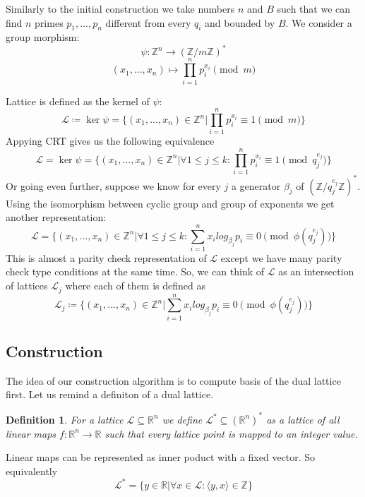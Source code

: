 \documentclass[12pt]{article}
\newcommand{\ZZ}{\mathbb{Z}}
\newcommand{\LL}{\mathcal{L}}
\newtheorem{definition}{Definition}
\begin{document}
Similarly to the initial construction we take numbers $n$ and $B$ such that we can find $n$ primes $p_{1}, ... , p_{n}$ different from every $q_{i}$ and bounded by $B$. We consider a group morphism:
\begin{equation}
    \psi : \ZZ^{n} \rightarrow (\ZZ/m\ZZ)^*
\end{equation}
\begin{equation}
    (x_{1}, ..., x_{n}) \mapsto \prod_{i=1}^{n}p_{i}^{x_{i}} \pmod{m}
\end{equation}

Lattice is defined as the kernel of $\psi$:
\begin{equation}
    \LL \coloneqq \ker \psi = \{(x_{1}, ..., x_{n}) \in \ZZ^{n} | \prod_{i=1}^{n}p_{i}^{x_{i}} \equiv 1 \pmod{m}\}
\end{equation}
Appying CRT gives us the following equivalence
\begin{equation}
    \LL = \ker \psi = \{(x_{1}, ..., x_{n}) \in \ZZ^{n} |  \forall 1 \leq j \leq k: \prod_{i=1}^{n}p_{i}^{x_{i}} \equiv 1 \pmod{q_{j}^{e_{j}}}\}
\end{equation}
Or going even further, suppose we know for every $j$ a generator ${\beta_{j}}$ of  $(\ZZ/q_{j}^{e_{j}}\ZZ)^*$. Using the isomorphism between cyclic group and group of exponents we get another representation:
\begin{equation}
    \LL = \{(x_{1}, ..., x_{n}) \in \ZZ^{n} |  \forall 1 \leq j \leq k: \sum_{i=1}^{n}x_{i}log_{\beta_{j}}p_{i}\equiv 0 \pmod{\phi(q_{j}^{e_{j}})}\}
\end{equation}
This is almost a parity check representation of $\LL$ except we have many parity check type conditions at the same time. So, we can think of $\LL$ as an intersection of lattices $\LL_{j}$ where each of them is defined as
\begin{equation}
    \LL_{j} \coloneqq \{(x_{1}, ..., x_{n}) \in \ZZ^{n} | \sum_{i=1}^{n}x_{i}log_{\beta_{j}}p_{i}\equiv 0 \pmod{\phi(q_{j}^{e_{j}})}\}
\end{equation}

\subsection{Construction}
The idea of our construction algorithm is to compute basis of the dual lattice first. %
Let us remind a definiton of a dual lattice.
\begin{definition}
    For a lattice $\LL \subseteq \mathbb{R}^{n}$ we define $\LL^{*} \subseteq (\mathbb{R}^{n})^{*}$ as a lattice of all linear maps $f:\mathbb{R}^{n} \rightarrow \mathbb{R}$ such that every lattice point is mapped to an integer value.
\end{definition}
Linear maps can be represented as inner poduct with a fixed vector. So equivalently
\begin{equation}
    \LL^{*} = \{y \in \mathbb{R} | \forall x \in \LL:  \langle y,x\rangle \in \ZZ \}
\end{equation}
\end{document}
